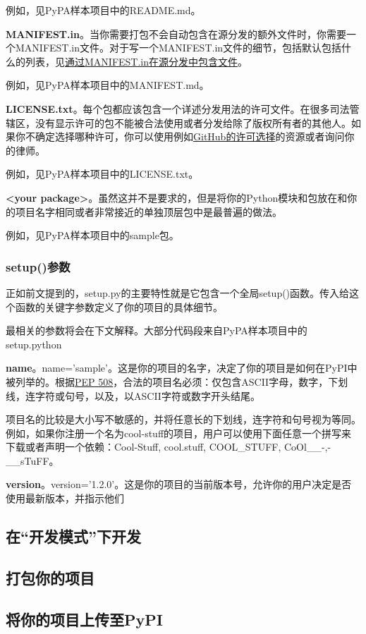 \documentclass[../package_guide.tex]{subfiles}
\begin{document}
例如，见PyPA样本项目中的README.md。

\textbf{MANIFEST.in}。当你需要打包不会自动包含在源分发的额外文件时，你需要一个MANIFEST.in文件。对于写一个MANIFEST.in文件的细节，包括默认包括什么的列表，见\href{https://packaging.python.org/guides/using-manifest-in/#using-manifest-in}{通过MANIFEST.in在源分发中包含文件}。

例如，见PyPA样本项目中的MANIFEST.md。

\textbf{LICENSE.txt}。每个包都应该包含一个详述分发用法的许可文件。在很多司法管辖区，没有显示许可的包不能被合法使用或者分发给除了版权所有者的其他人。如果你不确定选择哪种许可，你可以使用例如\href{https://choosealicense.com/}{GitHub的许可选择}的资源或者询问你的律师。

例如，见PyPA样本项目中的LICENSE.txt。

\textbf{<your package>}。虽然这并不是要求的，但是将你的Python模块和包放在和你的项目名字相同或者非常接近的单独顶层包中是最普遍的做法。

例如，见PyPA样本项目中的sample包。

\subsubsection{setup()参数}

正如前文提到的，setup.py的主要特性就是它包含一个全局setup()函数。传入给这个函数的关键字参数定义了你的项目的具体细节。

最相关的参数将会在下文解释。大部分代码段来自PyPA样本项目中的setup.python

\textbf{name}。name='sample'。这是你的项目的名字，决定了你的项目是如何在PyPI中被列举的。根据\href{https://www.python.org/dev/peps/pep-0508}{PEP 508}，合法的项目名必须：仅包含ASCII字母，数字，下划线，连字符或句号，以及，以ASCII字符或数字开头结尾。

项目名的比较是大小写不敏感的，并将任意长的下划线，连字符和句号视为等同。例如，如果你注册一个名为cool-stuff的项目，用户可以使用下面任意一个拼写来下载或者声明一个依赖：Cool-Stuff, cool.stuff, COOL_STUFF, CoOl__-,-__sTuFF。

\textbf{version}。version='1.2.0'。这是你的项目的当前版本号，允许你的用户决定是否使用最新版本，并指示他们

\subsection{在“开发模式”下开发}
\subsection{打包你的项目}
\subsection{将你的项目上传至PyPI}
\end{document}
